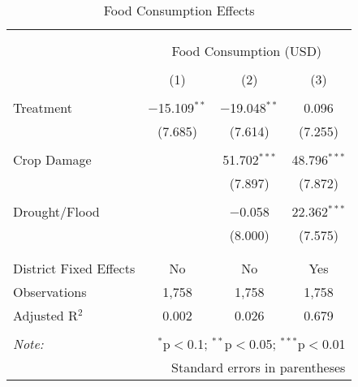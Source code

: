 
\begin{table}[!htbp] \centering 
  \caption{Food Consumption Effects} 
  \label{} 
\begin{tabular}{@{\extracolsep{5pt}}lccc} 
\\[-1.8ex]\hline 
\hline \\[-1.8ex] 
\\[-1.8ex] & \multicolumn{3}{c}{Food Consumption (USD)} \\ 
\\[-1.8ex] & (1) & (2) & (3)\\ 
\hline \\[-1.8ex] 
 Treatment & $-$15.109$^{**}$ & $-$19.048$^{**}$ & 0.096 \\ 
  & (7.685) & (7.614) & (7.255) \\ 
  & & & \\ 
 Crop Damage &  & 51.702$^{***}$ & 48.796$^{***}$ \\ 
  &  & (7.897) & (7.872) \\ 
  & & & \\ 
 Drought/Flood &  & $-$0.058 & 22.362$^{***}$ \\ 
  &  & (8.000) & (7.575) \\ 
  & & & \\ 
\hline \\[-1.8ex] 
District Fixed Effects & No & No & Yes \\ 
Observations & 1,758 & 1,758 & 1,758 \\ 
Adjusted R$^{2}$ & 0.002 & 0.026 & 0.679 \\ 
\hline 
\hline \\[-1.8ex] 
\textit{Note:}  & \multicolumn{3}{r}{$^{*}$p$<$0.1; $^{**}$p$<$0.05; $^{***}$p$<$0.01} \\ 
 & \multicolumn{3}{r}{Standard errors in parentheses} \\ 
\end{tabular} 
\end{table} 
